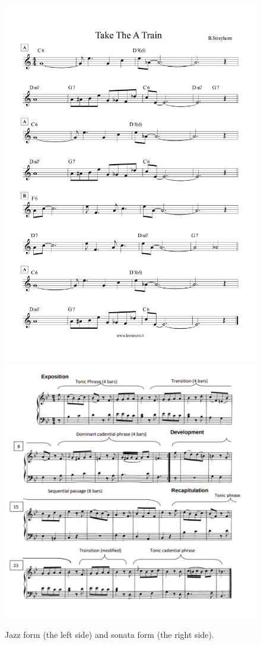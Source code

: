 \begin{figure}[H]
\centering
\hfill
\includegraphics[scale=0.32]{obrazky-figures/Take-the-A-train-Billy-Strayhorn.pdf}
\hfill
\includegraphics[scale=0.42]{obrazky-figures/sonataform.pdf}
\hfill
\caption{Jazz form (the left side) and sonata form (the right side).}
\label{fig:jazzclassic}
\end{figure}

